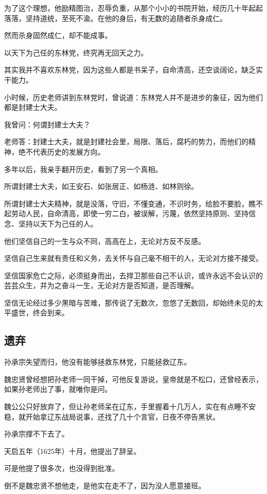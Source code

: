 \begin{multicols}{\theparacolNo}
		为了这个理想，他励精图治，忍辱负重，从那个小小的书院开始，经历几十年起起落落，坚持道统，至死不渝。在他的身后，有无数的追随者杀身成仁。

		然而杀身固然成仁，却不能成事。

		以天下为己任的东林党，终究再无回天之力。

		其实我并不喜欢东林党，因为这些人都是书呆子，自命清高，还空谈阔论，缺乏实干能力。

		小时候，历史老师讲到东林党时，曾说道：东林党人并不是进步的象征，因为他们都是封建士大夫。

		我曾问：何谓封建士大夫？

		老师答：封建士大夫，就是封建社会里，局限、落后，腐朽的势力，而他们的精神，绝不代表历史的发展方向。

		多年以后，我亲手翻开历史，看到了另一个真相。

		所谓封建士大夫，如王安石、如张居正、如杨涟、如林则徐。

		所谓封建士大夫精神，就是没落，守旧，不懂变通，不识时务，给脸不要脸，瞧不起劳动人民，自命清高，即使一穷二白，被误解，污蔑，依然坚持原则、坚持信念、坚持以天下为己任的人。

		他们坚信自己的一生与众不同，高高在上，无论对方反不反感。

		坚信自己生来就有责任和义务，去关怀与自己毫不相干的人，无论对方接不接受。

		坚信国家危亡之际，必须挺身而出，去捍卫那些自己不认识，或许永远不会认识的芸芸众生，并为之奋斗一生，无论对方是否知道，是否理解。

		坚信无论经过多少黑暗与苦难，那传说了无数次，忽悠了无数回，却始终未见的太平盛世，终会到来。

		\subsection{遗弃}
		孙承宗失望而归，他没有能够拯救东林党，只能拯救辽东。

		魏忠贤曾经想把孙老师一同干掉，可他反复游说，皇帝就是不松口，还曾经表示，如果孙老师出了事，就唯你是问。

		魏公公只好放弃了，但让孙老师呆在辽东，手里握着十几万人，实在有点睡不安稳，就开始拿辽东战局说事，还找了几十个言官，日夜不停告黑状。

		孙承宗撑不下去了。

		天启五年（1625年）十月，他提出了辞呈。

		可是他提了很多次，也没得到批准。

		倒不是魏忠贤不想他走，是他实在走不了，因为没人愿意接班。


\end{multicols}
